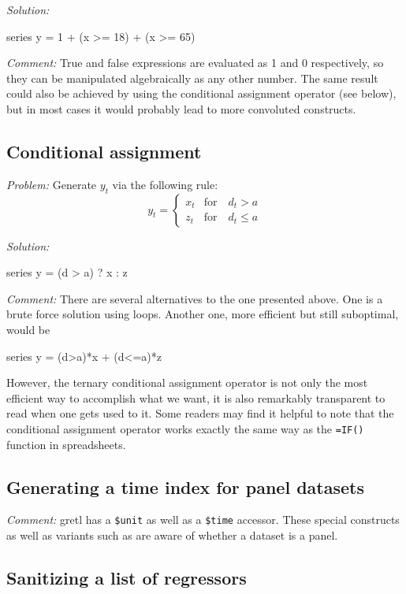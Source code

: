 \emph{Solution:}
\begin{code}
series y = 1 + (x >= 18) + (x >= 65)
\end{code}

\emph{Comment:} True and false expressions are evaluated as 1 and 0
respectively, so they can be manipulated algebraically as any other
number. The same result could also be achieved by using the
conditional assignment operator (see below), but in most cases it
would probably lead to more convoluted constructs.

\subsection{Conditional assignment}

\emph{Problem:} Generate $y_t$ via the following rule:
\[
  y_t = \left\{
    \begin{array}{ll}
      x_t & \mathrm{for} \quad d_t > a \\
      z_t & \mathrm{for} \quad d_t \le a
    \end{array}
    \right.
\]

\emph{Solution:}
\begin{code}
series y = (d > a) ? x : z
\end{code}

\emph{Comment:} There are several alternatives to the one presented
above. One is a brute force solution using loops. Another one, more
efficient but still suboptimal, would be
\begin{code}
series y = (d>a)*x + (d<=a)*z
\end{code}
However, the ternary conditional assignment operator is not only the
most efficient way to accomplish what we want, it is also remarkably
transparent to read when one gets used to it. Some readers may find it
helpful to note that the conditional assignment operator works exactly
the same way as the \texttt{=IF()} function in spreadsheets.

\subsection{Generating a time index for panel datasets}

\emph{Comment:} gretl has a \texttt{\$unit} as well as a \texttt{\$time}
accessor. These special constructs as well as variants such as
 are aware of whether a dataset is a panel.

\subsection{Sanitizing a list of regressors}


